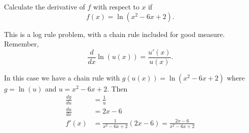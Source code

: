 \documentclass{ximera}
\author{Emma Smith Zbarsky}
\begin{document}
\begin{exercise}

Calculate the derivative of $f$ with respect to $x$ if
\[f(x) = \ln(x^2-6x+2).\]


\begin{hint}
This is a log rule problem, with a chain rule included for good measure.
Remember, \[\frac{d}{dx}\ln(u(x)) = \frac{u'(x)}{u(x)}.\]
\end{hint}


\begin{hint}
In this case we have a chain rule with $g(u(x)) = \ln(x^2-6x+2)$ where
$g = \ln(u)$ and $u = x^2-6x+2$. Then \begin{align*}
\frac{dg}{du} &= \frac{1}{u} \\
\frac{du}{dx} &= 2x-6 \\
f'(x) &= \frac{1}{x^2-6x+2}\left(2x-6\right) = \frac{2x-6}{x^2-6x+2}
\end{align*}
\end{hint}


\begin{multipleChoice}
\end{multipleChoice}

\end{exercise}
\end{document}
